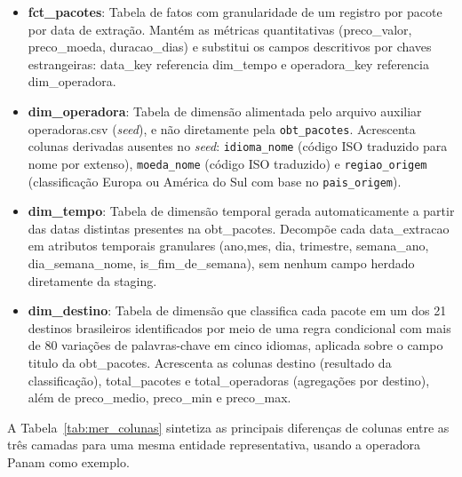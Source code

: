 \begin{itemize}
    \item \textbf{fct\_pacotes}: Tabela de fatos com granularidade de
    um registro por pacote por data de extração. Mantém as métricas quantitativas
    (preco\_valor, preco\_moeda, duracao\_dias) e
    substitui os campos descritivos por chaves estrangeiras: data\_key
    referencia dim\_tempo e operadora\_key referencia
    dim\_operadora.

    \item \textbf{dim\_operadora}: Tabela de dimensão alimentada pelo
    arquivo auxiliar operadoras.csv (\textit{seed}), e não diretamente
    pela \texttt{obt\_pacotes}. Acrescenta colunas derivadas ausentes no
    \textit{seed}: \texttt{idioma\_nome} (código ISO traduzido para nome por
    extenso), \texttt{moeda\_nome} (código ISO traduzido) e \texttt{regiao\_origem}
    (classificação Europa ou América do Sul com base no \texttt{pais\_origem}).

    \item \textbf{dim\_tempo}: Tabela de dimensão temporal gerada
    automaticamente a partir das datas distintas presentes na obt\_pacotes.
    Decompõe cada data\_extracao em atributos temporais granulares
    (ano,mes, dia, trimestre,
    semana\_ano, dia\_semana\_nome, is\_fim\_de\_semana),
    sem nenhum campo herdado diretamente da staging.

    \item \textbf{dim\_destino}: Tabela de dimensão que classifica cada
    pacote em um dos 21 destinos brasileiros identificados por meio de uma regra
    condicional com mais de 80 variações de palavras-chave em cinco idiomas,
    aplicada sobre o campo titulo da obt\_pacotes. Acrescenta
    as colunas destino (resultado da classificação),
    total\_pacotes e total\_operadoras (agregações por destino),
    além de preco\_medio, preco\_min e preco\_max.
\end{itemize}

A Tabela~\ref{tab:mer_colunas} sintetiza as principais diferenças de colunas entre
as três camadas para uma mesma entidade representativa, usando a operadora Panam
como exemplo.

